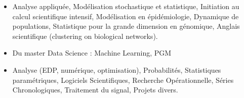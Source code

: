 \documentclass[10pt,a4paper]{altacv}
\begin{document}



\begin{fullwidth}
\makecvheader
\end{fullwidth}



\begin{itemize}
\item %
    Analyse appliquée, Modélisation stochastique et statistique, Initiation au calcul scientifique intensif, Modélisation en épidémiologie, Dynamique de populations, Statistique pour la grande dimension en génomique, Anglais scientifique (clustering on biological networks).
\item Du master Data Science : Machine Learning, PGM
\end{itemize}

\begin{itemize}
\item %
    Analyse (EDP, numérique, optimisation), Probabilités, Statistiques paramétriques, Logiciels Scientifiques, Recherche Opérationnelle, Séries Chronologiques, Traitement du signal, Projets divers.
\end{itemize}


\end{document}
